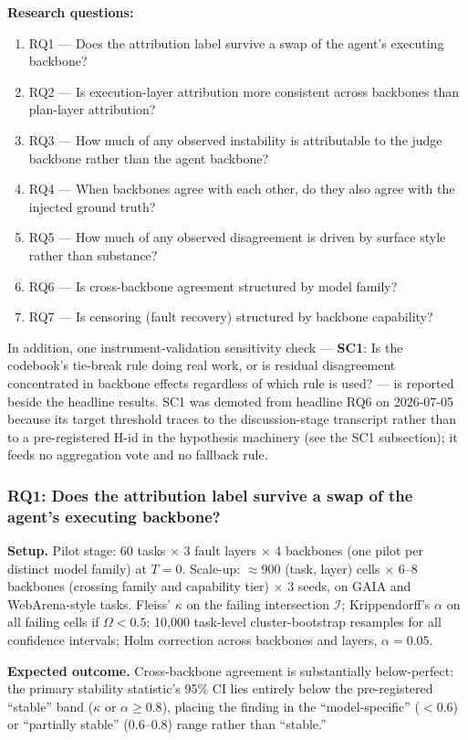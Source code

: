 \documentclass[11pt]{article}
\begin{document}
\textbf{Research questions:}
\begin{enumerate}[leftmargin=1.6em]
\item RQ1 --- Does the attribution label survive a swap of the agent's executing backbone?
\item RQ2 --- Is execution-layer attribution more consistent across backbones than plan-layer attribution?
\item RQ3 --- How much of any observed instability is attributable to the judge backbone rather than the agent backbone?
\item RQ4 --- When backbones agree with each other, do they also agree with the injected ground truth?
\item RQ5 --- How much of any observed disagreement is driven by surface style rather than substance?
\item RQ6 --- Is cross-backbone agreement structured by model family?
\item RQ7 --- Is censoring (fault recovery) structured by backbone capability?
\end{enumerate}

In addition, one instrument-validation sensitivity check --- \textbf{SC1}: Is the codebook's tie-break rule doing real work, or is residual disagreement concentrated in backbone effects regardless of which rule is used? --- is reported beside the headline results. SC1 was demoted from headline RQ6 on 2026-07-05 because its target threshold traces to the discussion-stage transcript rather than to a pre-registered H-id in the hypothesis machinery (see the SC1 subsection); it feeds no aggregation vote and no fallback rule.

\subsubsection{RQ1: Does the attribution label survive a swap of the agent's executing backbone?}
\textbf{Setup.} Pilot stage: 60 tasks $\times$ 3 fault layers $\times$ 4 backbones (one pilot per distinct model family) at $T=0$. Scale-up: $\approx$900 (task, layer) cells $\times$ 6--8 backbones (crossing family and capability tier) $\times$ 3 seeds, on GAIA and WebArena-style tasks. Fleiss' $\kappa$ on the failing intersection $\mathcal{I}$; Krippendorff's $\alpha$ on all failing cells if $\Omega < 0.5$; 10,000 task-level cluster-bootstrap resamples for all confidence intervals; Holm correction across backbones and layers, $\alpha = 0.05$.

\textbf{Expected outcome.} Cross-backbone agreement is substantially below-perfect: the primary stability statistic's 95\% CI lies entirely below the pre-registered ``stable'' band ($\kappa$ or $\alpha \geq 0.8$), placing the finding in the ``model-specific'' ($< 0.6$) or ``partially stable'' (0.6--0.8) range rather than ``stable.''
\end{document}
